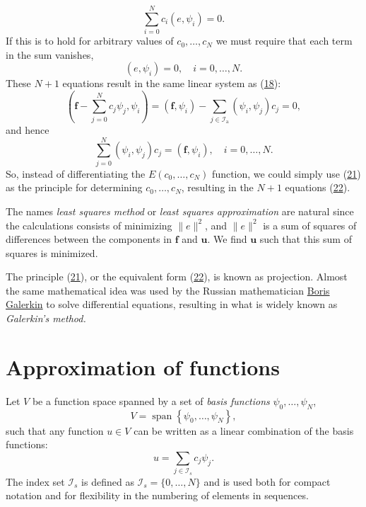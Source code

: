 \documentclass[../main.tex]{subfiles}
\begin{document}
$$
\sum_{i=0}^{N} c_{i}\left(e, \psi_{i}\right)=0.
$$
If this is to hold for arbitrary values of $c_{0}, \ldots, c_{N}$ we must require that each term in the sum vanishes,
\begin{equation}\label{eqa22}
	\left(e, \psi_{i}\right)=0, \quad i=0, \ldots, N.
\end{equation}
These $N+1$ equations result in the same linear system as (\hyperref[eqa18]{18}):
$$
\left(\boldsymbol{f}-\sum_{j=0}^{N} c_{j} \psi_{j}, \psi_{i}\right)=\left(\boldsymbol{f}, \psi_{i}\right)-\sum_{j \in \mathcal{I}_{\mathrm{a}}}\left(\psi_{i}, \psi_{j}\right) c_{j}=0,
$$
and hence
$$
\sum_{j=0}^{N}\left(\psi_{i}, \psi_{j}\right) c_{j}=\left(\boldsymbol{f}, \psi_{i}\right), \quad i=0, \ldots, N.
$$
So, instead of differentiating the $E\left(c_{0}, \ldots, c_{N}\right)$ function, we could simply use (\hyperref[eqa21]{21}) as the principle for determining $c_{0}, \ldots, c_{N}$, resulting in the $N+1$ equations (\hyperref[eqa22]{22}).

The names \textit{least squares method} or \textit{least squares approximation} are natural since the calculations consists of minimizing $\|e\|^{2}$, and $\|e\|^{2}$ is a sum of squares of differences between the components in $\boldsymbol{f}$ and $\boldsymbol{u}$. We find $\boldsymbol{u}$ such that this sum of squares is minimized.

The principle (\hyperref[eqa21]{21}), or the equivalent form (\hyperref[eqa22]{22}), is known as projection. Almost the same mathematical idea was used by the Russian mathematician \href{https://en.wikipedia.org/wiki/Boris_Galerkin}{Boris Galerkin} to solve differential equations, resulting in what is widely known as \textit{Galerkin's method.}

\chapter{Approximation of functions}
\label{chap:chap_2}
Let $V$ be a function space spanned by a set of \textit{basis functions} $\psi_{0}, \ldots, \psi_{N}$,
$$
V=\operatorname{span}\left\{\psi_{0}, \ldots, \psi_{N}\right\},
$$
such that any function $u \in V$ can be written as a linear combination of the basis functions:
\begin{equation}\label{eqa23}
	u=\sum_{j \in \mathcal{I}_{s}} c_{j} \psi_{j}.
\end{equation}
The index set $\mathcal{I}_{s}$ is defined as $\mathcal{I}_{s}=\{0, \ldots, N\}$ and is used both for compact notation and for flexibility in the numbering of elements in sequences.
\end{document}
